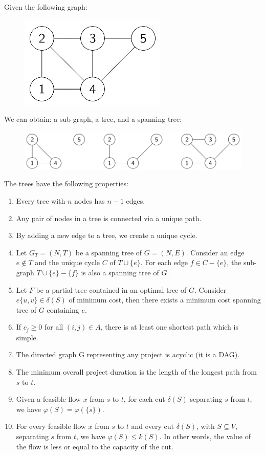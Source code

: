 \documentclass[12pt, a4paper]{report}
\newtheorem[style=M,bodystyle=\normalfont]{proposition}{Proposition}
\newtheorem[style=M,bodystyle=\normalfont]{theorem}{Theorem}
\newtheorem[style=M,bodystyle=\normalfont]{corollary}{Corollary}
\newtheorem[style=M,bodystyle=\normalfont]{lemma}{Lemma}
\newtheorem[style=M,bodystyle=\normalfont]{definition}{Definition}
\begin{document}
    \begin{example}
        Given the following graph: 
        \begin{figure}[H]
            \centering
            \includegraphics[width=0.3\linewidth]{images/sgraph.png}
        \end{figure}
        We can obtain: a sub-graph, a tree, and a spanning tree: 
        \begin{figure}[H]
            \centering
            \includegraphics[width=0.8\linewidth]{images/sgraphmod.png}
        \end{figure}
    \end{example}
    The trees have the following properties: 
    \begin{enumerate}
        \item Every tree with $n$ nodes has $n-1$ edges. 
        \item Any pair of nodes in a tree is connected via a unique path. 
        \item By adding a new edge to a tree, we create a unique cycle. 
        \item Let $G_T=(N,T)$ be a spanning tree of $G=(N,E)$. Consider an edge $e \notin T$ and the unique cycle $C$ of $T \cup \{e\}$. For each edge $f \in C-\{e\}$, the 
            sub-graph $T\cup \{e\}-\{f\}$ is also a spanning tree of $G$. 
        \item Let $F$ be a partial tree contained in an optimal tree of $G$. Consider $e\{u,v\}\in \delta(S)$ of minimum cost, then there exists a minimum cost spanning tree of 
            $G$ containing $e$. 
        \item If $c_j \geq 0$ for all $(i,j) \in A$, there is at least one shortest path which is simple. 
        \item The directed graph G representing any project is acyclic (it is a DAG). 
        \item The minimum overall project duration is the length of the longest path from $s$ to $t$. 
        \item Given a feasible flow $x$ from $s$ to $t$, for each cut $\delta(S)$ separating $s$ from $t$, we have $\varphi(S)=\varphi(\{s\})$.
        \item For every feasible flow $x$ from $s$ to $t$ and every cut $\delta(S)$, with $S \subseteq V$, separating $s$ from $t$, we have $\varphi(S) \leq k(S)$. In other words,
            the value of the flow is less or equal to the capacity of the cut. 
    \end{enumerate}
\end{document}
